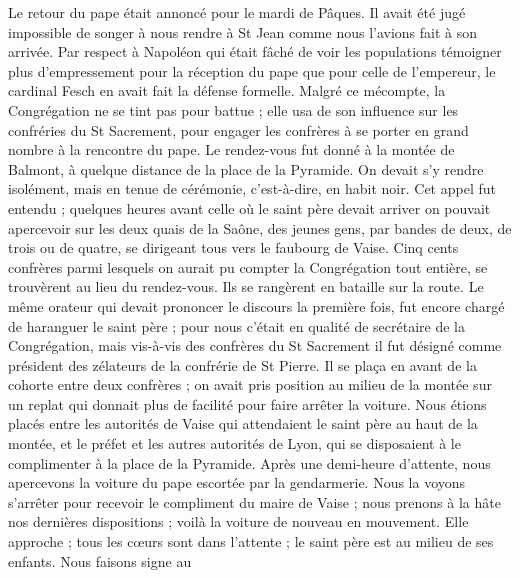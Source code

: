 Le retour du pape était annoncé pour le mardi de Pâques. Il avait été jugé impossible de songer à nous rendre à St Jean comme nous l'avions fait à son arrivée. Par respect à Napoléon qui était fâché de voir les populations témoigner plus d'empressement pour la réception du pape que pour celle de l'empereur, le cardinal Fesch en avait fait la défense formelle. Malgré ce mécompte, la Congrégation ne se tint pas pour battue ; elle usa de son influence sur les confréries du St Sacrement, pour engager les confrères
à se porter en grand nombre à la rencontre du pape. Le rendez-vous fut donné à la montée de Balmont, à quelque distance de la place de la Pyramide. On devait s'y rendre isolément, mais en tenue de cérémonie, c'est-à-dire, en habit noir. Cet appel fut entendu ; quelques heures avant celle où le saint père devait arriver on pouvait apercevoir sur les deux quais de la Saône, des jeunes gens, par bandes de deux, de trois ou de quatre, se dirigeant tous vers le faubourg de Vaise. Cinq cents confrères parmi lesquels on aurait pu compter la Congrégation tout entière, se trouvèrent au lieu du rendez-vous. Ils se rangèrent en bataille sur la route. Le même orateur qui devait prononcer le discours la première fois, fut encore chargé de haranguer le saint père ; pour nous c'était en qualité de secrétaire de la Congrégation, mais vis-à-vis des confrères du St Sacrement il fut désigné comme président des zélateurs de la confrérie de St Pierre. Il se plaça en avant de la cohorte entre deux confrères ; on avait pris position au milieu de la montée sur un replat qui donnait plus de facilité pour faire arrêter la voiture. Nous étions placés entre les autorités de Vaise qui attendaient le saint père au haut de la montée, et le préfet et les autres autorités de Lyon, qui se disposaient à le complimenter à la place de la Pyramide. Après une demi-heure d'attente, nous apercevons la voiture du pape escortée par la gendarmerie. Nous la voyons s'arrêter pour recevoir le compliment du maire de Vaise ; nous prenons à la hâte nos dernières dispositions ; voilà la voiture de nouveau en mouvement. Elle approche ; tous les cœurs sont dans l'attente ; le saint père est au milieu de ses enfants. Nous faisons signe au
